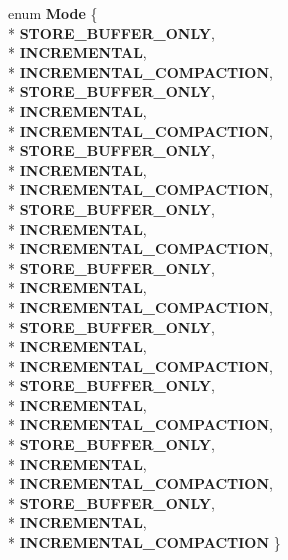 \begin{DoxyCompactItemize}
\item 
enum {\bfseries Mode} \{ \\*
{\bfseries S\+T\+O\+R\+E\+\_\+\+B\+U\+F\+F\+E\+R\+\_\+\+O\+N\+LY}, 
\\*
{\bfseries I\+N\+C\+R\+E\+M\+E\+N\+T\+AL}, 
\\*
{\bfseries I\+N\+C\+R\+E\+M\+E\+N\+T\+A\+L\+\_\+\+C\+O\+M\+P\+A\+C\+T\+I\+ON}, 
\\*
{\bfseries S\+T\+O\+R\+E\+\_\+\+B\+U\+F\+F\+E\+R\+\_\+\+O\+N\+LY}, 
\\*
{\bfseries I\+N\+C\+R\+E\+M\+E\+N\+T\+AL}, 
\\*
{\bfseries I\+N\+C\+R\+E\+M\+E\+N\+T\+A\+L\+\_\+\+C\+O\+M\+P\+A\+C\+T\+I\+ON}, 
\\*
{\bfseries S\+T\+O\+R\+E\+\_\+\+B\+U\+F\+F\+E\+R\+\_\+\+O\+N\+LY}, 
\\*
{\bfseries I\+N\+C\+R\+E\+M\+E\+N\+T\+AL}, 
\\*
{\bfseries I\+N\+C\+R\+E\+M\+E\+N\+T\+A\+L\+\_\+\+C\+O\+M\+P\+A\+C\+T\+I\+ON}, 
\\*
{\bfseries S\+T\+O\+R\+E\+\_\+\+B\+U\+F\+F\+E\+R\+\_\+\+O\+N\+LY}, 
\\*
{\bfseries I\+N\+C\+R\+E\+M\+E\+N\+T\+AL}, 
\\*
{\bfseries I\+N\+C\+R\+E\+M\+E\+N\+T\+A\+L\+\_\+\+C\+O\+M\+P\+A\+C\+T\+I\+ON}, 
\\*
{\bfseries S\+T\+O\+R\+E\+\_\+\+B\+U\+F\+F\+E\+R\+\_\+\+O\+N\+LY}, 
\\*
{\bfseries I\+N\+C\+R\+E\+M\+E\+N\+T\+AL}, 
\\*
{\bfseries I\+N\+C\+R\+E\+M\+E\+N\+T\+A\+L\+\_\+\+C\+O\+M\+P\+A\+C\+T\+I\+ON}, 
\\*
{\bfseries S\+T\+O\+R\+E\+\_\+\+B\+U\+F\+F\+E\+R\+\_\+\+O\+N\+LY}, 
\\*
{\bfseries I\+N\+C\+R\+E\+M\+E\+N\+T\+AL}, 
\\*
{\bfseries I\+N\+C\+R\+E\+M\+E\+N\+T\+A\+L\+\_\+\+C\+O\+M\+P\+A\+C\+T\+I\+ON}, 
\\*
{\bfseries S\+T\+O\+R\+E\+\_\+\+B\+U\+F\+F\+E\+R\+\_\+\+O\+N\+LY}, 
\\*
{\bfseries I\+N\+C\+R\+E\+M\+E\+N\+T\+AL}, 
\\*
{\bfseries I\+N\+C\+R\+E\+M\+E\+N\+T\+A\+L\+\_\+\+C\+O\+M\+P\+A\+C\+T\+I\+ON}, 
\\*
{\bfseries S\+T\+O\+R\+E\+\_\+\+B\+U\+F\+F\+E\+R\+\_\+\+O\+N\+LY}, 
\\*
{\bfseries I\+N\+C\+R\+E\+M\+E\+N\+T\+AL}, 
\\*
{\bfseries I\+N\+C\+R\+E\+M\+E\+N\+T\+A\+L\+\_\+\+C\+O\+M\+P\+A\+C\+T\+I\+ON}, 
\\*
{\bfseries S\+T\+O\+R\+E\+\_\+\+B\+U\+F\+F\+E\+R\+\_\+\+O\+N\+LY}, 
\\*
{\bfseries I\+N\+C\+R\+E\+M\+E\+N\+T\+AL}, 
\\*
{\bfseries I\+N\+C\+R\+E\+M\+E\+N\+T\+A\+L\+\_\+\+C\+O\+M\+P\+A\+C\+T\+I\+ON}
 \}\hypertarget{classv8_1_1internal_1_1_record_write_stub_adaa3c49c2efe74f9d635fc17eb76aabe}{}\label{classv8_1_1internal_1_1_record_write_stub_adaa3c49c2efe74f9d635fc17eb76aabe}

\end{DoxyCompactItemize}
